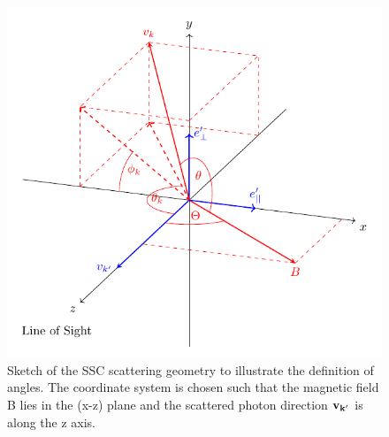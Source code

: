 
\begin{figure}[t]
\includegraphics[width=0.8\linewidth]{figures/Figure1.pdf}
\centering
\caption{Sketch of the SSC scattering geometry to illustrate the definition of angles. The coordinate system is chosen such that the magnetic field B lies in the (x-z) plane and the scattered photon direction ${\bf v_{k'}}$ is along the z axis.}
\label{fig:ssc1}
\end{figure}

